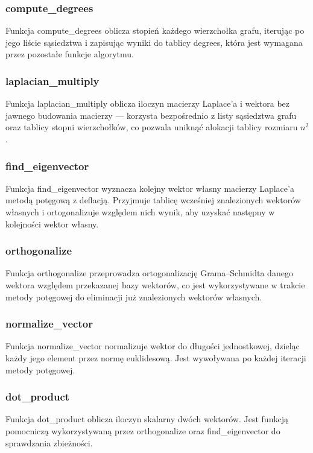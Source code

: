 \documentclass[12pt]{article}
\begin{document}
\subsubsection{compute\_degrees}
Funkcja compute\_degrees oblicza stopień każdego wierzchołka grafu, iterując po jego
liście sąsiedztwa i zapisując wyniki do tablicy degrees, która jest wymagana przez
pozostałe funkcje algorytmu.
\subsubsection{laplacian\_multiply}
Funkcja laplacian\_multiply oblicza iloczyn macierzy Laplace'a i wektora bez jawnego
budowania macierzy --- korzysta bezpośrednio z listy sąsiedztwa grafu oraz tablicy
stopni wierzchołków, co pozwala uniknąć alokacji tablicy rozmiaru $n^2$.
\subsubsection{find\_eigenvector}
Funkcja find\_eigenvector wyznacza kolejny wektor własny macierzy Laplace'a metodą
potęgową z deflacją. Przyjmuje tablicę wcześniej znalezionych wektorów własnych
i ortogonalizuje względem nich wynik, aby uzyskać następny w kolejności wektor własny.
\subsubsection{orthogonalize}
Funkcja orthogonalize przeprowadza ortogonalizację Grama--Schmidta danego wektora
względem przekazanej bazy wektorów, co jest wykorzystywane w trakcie metody potęgowej
do eliminacji już znalezionych wektorów własnych.
\subsubsection{normalize\_vector}
Funkcja normalize\_vector normalizuje wektor do długości jednostkowej, dzieląc każdy
jego element przez normę euklidesową. Jest wywoływana po każdej iteracji metody
potęgowej.
\subsubsection{dot\_product}
Funkcja dot\_product oblicza iloczyn skalarny dwóch wektorów. Jest funkcją pomocniczą
wykorzystywaną przez orthogonalize oraz find\_eigenvector do sprawdzania zbieżności.
\end{document}
